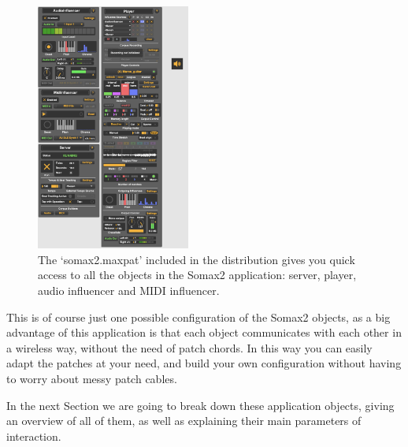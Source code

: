 \begin{figure}[H]
    \centering        
 	\includegraphics[width=0.45\textwidth]{img/somax2-6.png}
    \caption{The `somax2.maxpat' included in the distribution gives you quick access to all the objects in the Somax2 application: server, player, audio influencer and MIDI influencer.}
    \label{fig:somax2_ui}
\end{figure}

This is of course just one possible configuration of the Somax2 objects, as a big advantage of this application is that each object communicates with each other in a wireless way, without the need of patch chords. In this way you can easily adapt the patches at your need, and build your own configuration without having to worry about messy patch cables.

In the next Section we are going to break down these application objects, giving an overview of all of them, as well as explaining their main parameters of interaction.

